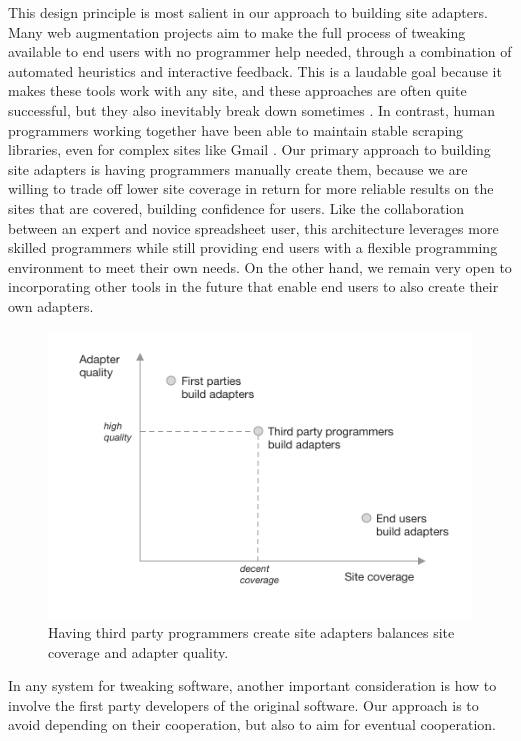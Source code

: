 \documentclass[english,submission]{programming}
\begin{document}
This design principle is most salient in our approach to building site
adapters. Many web augmentation projects aim to make the full process of
tweaking available to end users with no programmer help needed, through
a combination of automated heuristics and interactive feedback. This is
a laudable goal because it makes these tools work with any site, and
these approaches are often quite successful, but they also inevitably
break down sometimes \autocite{bolin2005} \autocite{little2010}. In
contrast, human programmers working together have been able to maintain
stable scraping libraries, even for complex sites like Gmail
\autocite{streak,talwar2019}. Our primary approach to building site
adapters is having programmers manually create them, because we are
willing to trade off lower site coverage in return for more reliable
results on the sites that are covered, building confidence for users.
Like the collaboration between an expert and novice spreadsheet user,
this architecture leverages more skilled programmers while still
providing end users with a flexible programming environment to meet
their own needs. On the other hand, we remain very open to incorporating
other tools in the future that enable end users to also create their own
adapters.

\begin{figure}
\centering
\includegraphics{media/adapters.png}
\caption{Having third party programmers create site adapters balances
site coverage and adapter quality.}
\end{figure}

In any system for tweaking software, another important consideration is
how to involve the first party developers of the original software. Our
approach is to avoid depending on their cooperation, but also to aim for
eventual cooperation.
\end{document}
